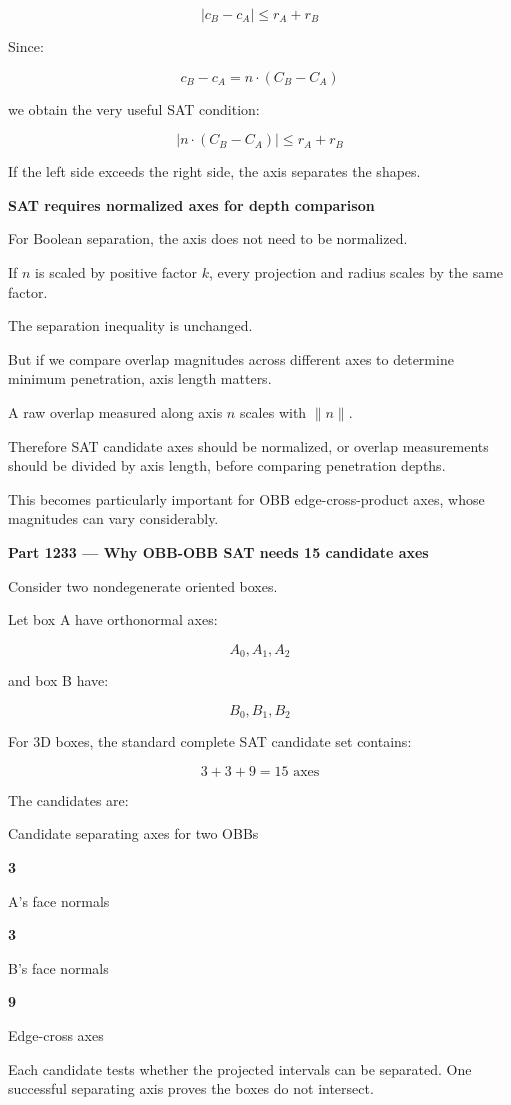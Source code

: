 \[
\boxed{ |c_B-c_A|\le r_A+r_B }
\]

Since:

\[
c_B-c_A=n\cdot(C_B-C_A)
\]

we obtain the very useful SAT condition:

\[
\boxed{ |n\cdot(C_B-C_A)|\le r_A+r_B }
\]

If the left side exceeds the right side, the axis separates the shapes.

\textbf{SAT requires normalized axes for depth comparison}

For Boolean separation, the axis does not need to be normalized.

If \(n\) is scaled by positive factor \(k\), every projection and radius scales by the same factor.

The separation inequality is unchanged.

But if we compare overlap magnitudes across different axes to determine minimum penetration, axis length matters.

A raw overlap measured along axis \(n\) scales with \(\|n\|\).

Therefore SAT candidate axes should be normalized, or overlap measurements should be divided by axis length, before comparing penetration depths.

This becomes particularly important for OBB edge-cross-product axes, whose magnitudes can vary considerably.

\textbf{Part 1233 --- Why OBB-OBB SAT needs 15 candidate axes}

Consider two nondegenerate oriented boxes.

Let box A have orthonormal axes:

\[
A_0,A_1,A_2
\]

and box B have:

\[
B_0,B_1,B_2
\]

For 3D boxes, the standard complete SAT candidate set contains:

\[
\boxed{ 3+3+9=15\text{ axes} }
\]

The candidates are:

Candidate separating axes for two OBBs

\textbf{3}

A's face normals

\textbf{3}

B's face normals

\textbf{9}

Edge-cross axes

Each candidate tests whether the projected intervals can be separated. One successful separating axis proves the boxes do not intersect.

